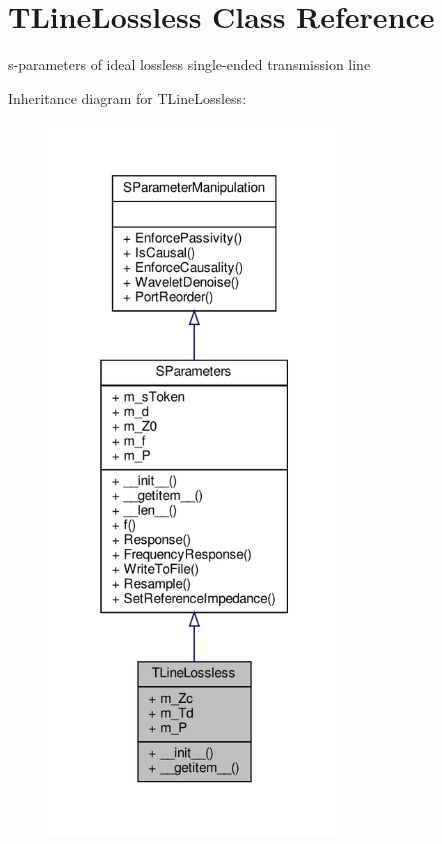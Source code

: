 \hypertarget{classSignalIntegrity_1_1SParameters_1_1Devices_1_1TLineLossless_1_1TLineLossless}{}\section{T\+Line\+Lossless Class Reference}
\label{classSignalIntegrity_1_1SParameters_1_1Devices_1_1TLineLossless_1_1TLineLossless}


s-\/parameters of ideal lossless single-\/ended transmission line  




Inheritance diagram for T\+Line\+Lossless\+:\nopagebreak
\begin{figure}[H]
\begin{center}
\leavevmode
\includegraphics[width=220pt]{classSignalIntegrity_1_1SParameters_1_1Devices_1_1TLineLossless_1_1TLineLossless__inherit__graph}
\end{center}
\end{figure}


